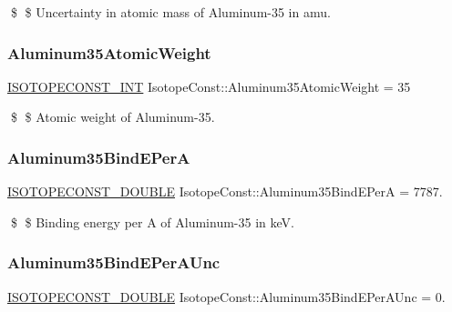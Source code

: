 \$ \$ Uncertainty in atomic mass of Aluminum-\/35 in amu. \mbox{\label{group___isotope_const-_aluminum-_al35_gac951cd1d9c5f2244eb52dd2aba213220}} 
\subsubsection{\texorpdfstring{Aluminum35\+Atomic\+Weight}{Aluminum35AtomicWeight}}
{\footnotesize\ttfamily \mbox{\hyperlink{group___isotope_const-_macros_ga5f18360b3e99483a35c32d789e62621c}{I\+S\+O\+T\+O\+P\+E\+C\+O\+N\+S\+T\+\_\+\+I\+NT}} Isotope\+Const\+::\+Aluminum35\+Atomic\+Weight = 35}

\$ \$ Atomic weight of Aluminum-\/35. \mbox{\label{group___isotope_const-_aluminum-_al35_ga5784851be6baf1daf766af8f6c1653a8}} 
\subsubsection{\texorpdfstring{Aluminum35\+Bind\+E\+PerA}{Aluminum35BindEPerA}}
{\footnotesize\ttfamily \mbox{\hyperlink{group___isotope_const-_macros_ga8f45a7272ce02c0b4c65c44636ed719a}{I\+S\+O\+T\+O\+P\+E\+C\+O\+N\+S\+T\+\_\+\+D\+O\+U\+B\+LE}} Isotope\+Const\+::\+Aluminum35\+Bind\+E\+PerA = 7787.}

\$ \$ Binding energy per A of Aluminum-\/35 in keV. \mbox{\label{group___isotope_const-_aluminum-_al35_ga6d21d642c62a083998578ccaf2719c17}} 
\subsubsection{\texorpdfstring{Aluminum35\+Bind\+E\+Per\+A\+Unc}{Aluminum35BindEPerAUnc}}
{\footnotesize\ttfamily \mbox{\hyperlink{group___isotope_const-_macros_ga8f45a7272ce02c0b4c65c44636ed719a}{I\+S\+O\+T\+O\+P\+E\+C\+O\+N\+S\+T\+\_\+\+D\+O\+U\+B\+LE}} Isotope\+Const\+::\+Aluminum35\+Bind\+E\+Per\+A\+Unc = 0.}

